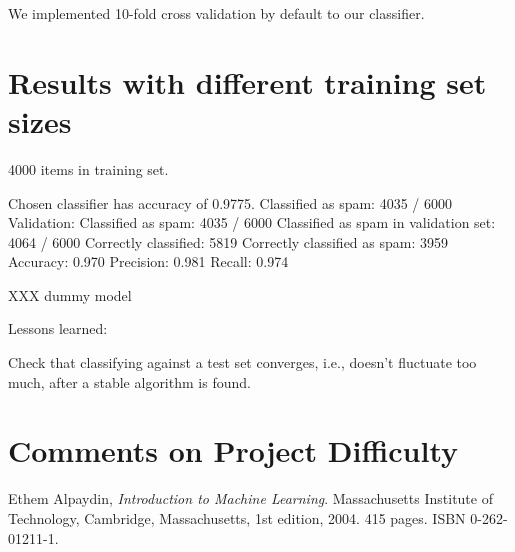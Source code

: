 \documentclass[a4paper,10pt]{article}
\begin{document}
We implemented 10-fold cross validation by default to our classifier.


\section{Results with different training set sizes}

4000 items in training set.

Chosen classifier has accuracy of 0.9775.
Classified as spam: 4035 / 6000
Validation:
 Classified as spam: 4035 / 6000
 Classified as spam in validation set: 4064 / 6000
 Correctly classified: 5819
 Correctly classified as spam: 3959
 Accuracy: 0.970
 Precision: 0.981
 Recall: 0.974

XXX dummy model

Lessons learned:

Check that classifying against a test set converges, i.e., doesn't
fluctuate too much, after a stable algorithm is found.

\newpage
\section*{Comments on Project Difficulty}




\begin{thebibliography}{9}
  Ethem Alpaydin,
  \emph{Introduction to Machine Learning}.
  Massachusetts Institute of Technology, Cambridge, Massachusetts,
  1st edition,
  2004. 415 pages. ISBN 0-262-01211-1.
\end{thebibliography}
\end{document}
